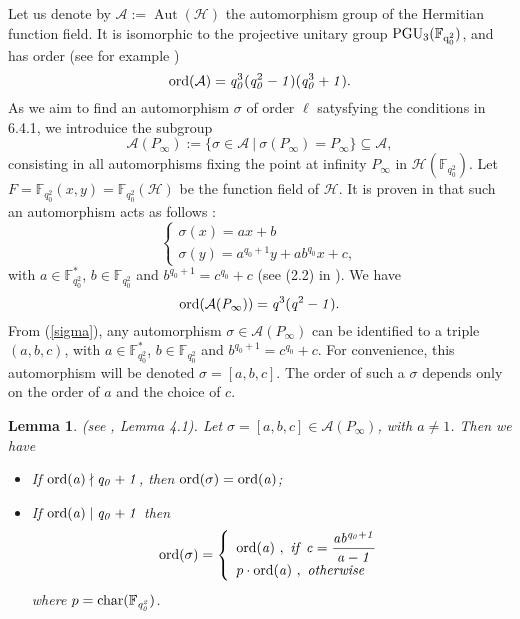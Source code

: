 \documentclass[10pt]{article}
\newtheorem{lem1}[thm]{Lemma}
\newcommand{\s}{\vspace{0.3cm}}
\newcommand{\cd}{\cdot}
\newcommand{\calA}{\mathcal{A}}
\newcommand{\calH}{\mathcal{H}}
\newcommand{\su}{\subseteq}
\newcommand{\Aut}{\operatorname{Aut}}
\begin{document}
Let us denote by $\calA := \Aut(\calH)$ the automorphism group of the Hermitian function field. It is isomorphic to the projective unitary group $\rm PGU_3(\mathbb{F}_{q_0^2})$, and has order (see for example \cite{Sti})
\[\rm ord \it (\calA) =  q_0^{\rm 3}\it (q_0^{\rm 2}-1)(\it q_0^{\rm 3}+1).\]
As we aim to find an automorphism $\sigma$ of order $\ell$ satysfying the conditions in 6.4.1, we introduice the subgroup
\[\calA(P_{\infty}) := \{ \sigma \in \calA \ | \ \sigma(P_{\infty}) = P_{\infty}\} \su \calA ,\]
consisting in all automorphisms fixing the point at infinity $P_{\infty}$ in $\calH(\mathbb{F}_{q_0^2})$. Let $F=\mathbb{F}_{q_0^2}(x,y)=\mathbb{F}_{q_0^2}(\calH)$ be the function field of $\calH$. It is proven in \cite{Gar} that such an automorphism acts as follows :
\begin{equation} \label{sigma}
\left\{ \begin{array}{ll}
\sigma(x) = ax+b \\
\sigma(y) = a^{q_0+1}y+ab^{q_0}x+c,
\end{array} \right.
\end{equation}
with $a \in \mathbb{F}_{q_0^2}^*$, $b \in \mathbb{F}_{q_0^2}$ and $b^{q_0+1} = c^{q_0}+c$ (see (2.2) in \cite{Gar}). We have 
\[\rm ord \it (\calA(P_{\infty})) = q^{\rm 3}\it (q^{\rm 2}-1).\]
From (\ref{sigma}), any automorphism $\sigma \in \calA(P_{\infty})$ can be identified to a triple $(a,b,c)$, with $a \in \mathbb{F}_{q_0^2}^*$, $b \in \mathbb{F}_{q_0^2}$ and $b^{q_0+1} = c^{q_0}+c$. For convenience, this automorphism will be denoted $\sigma = [a,b,c]$. The order of such a $\sigma$ depends only on the order of $a$ and the choice of $c$.

\s

\begin{lem1} \rm (see \cite{Gar}, Lemma 4.1). \it \label{ordsigma}
Let $\sigma = [a,b,c] \in \calA(P_{\infty})$, with $a \neq 1$. Then we have
\begin{itemize}
\item[(i)] If $\rm ord \it (a) \nmid q_0+1$, then $\rm ord \it (\sigma) = \rm ord \it (a)$;
\item[(ii)] If $\rm ord \it (a) \mid q_0+1$ then
\begin{equation*}
\rm ord \it (\sigma) = \left\{ \begin{array}{ll}
\rm ord \it (a) \ , \ if \ c=\dfrac{ab^{q_0+1}}{a-1} \\
p \cd \rm ord \it (a) \ , \  otherwise \ 
\end{array}
\right.
\end{equation*}
where $p=\rm char \it (\mathbb{F}_{q_0^2})$.
\end{itemize}
\end{lem1}
\end{document}
